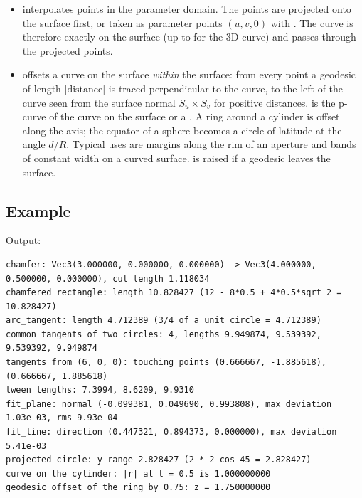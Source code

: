 \begin{itemize}
  \item {} interpolates points in the parameter domain. The points are projected onto
    the surface first, or taken as parameter points $(u, v, 0)$ with . The curve
    is therefore exactly on the surface (up to  for the 3D curve) and passes
    through the projected points.
  \item {} offsets a
    curve on the surface \emph{within} the surface: from every point a geodesic of length
    $|\text{distance}|$ is traced perpendicular to the curve, to the left of the curve seen from
    the surface normal $S_u \times S_v$ for positive distances.  is the p-curve of
    the curve on the surface or a . A ring around a cylinder is offset
    along the axis; the equator of a sphere becomes a circle of latitude at the angle
    $d/R$. Typical uses are margins along the rim of an aperture and bands of constant width
    on a curved surface.  is raised if a geodesic leaves the surface.
\end{itemize}

\subsection{Example}


Output:

\begin{lstlisting}[style=text]
chamfer: Vec3(3.000000, 0.000000, 0.000000) -> Vec3(4.000000, 0.500000, 0.000000), cut length 1.118034
chamfered rectangle: length 10.828427 (12 - 8*0.5 + 4*0.5*sqrt 2 = 10.828427)
arc_tangent: length 4.712389 (3/4 of a unit circle = 4.712389)
common tangents of two circles: 4, lengths 9.949874, 9.539392, 9.539392, 9.949874
tangents from (6, 0, 0): touching points (0.666667, -1.885618), (0.666667, 1.885618)
tween lengths: 7.3994, 8.6209, 9.9310
fit_plane: normal (-0.099381, 0.049690, 0.993808), max deviation 1.03e-03, rms 9.93e-04
fit_line: direction (0.447321, 0.894373, 0.000000), max deviation 5.41e-03
projected circle: y range 2.828427 (2 * 2 cos 45 = 2.828427)
curve on the cylinder: |r| at t = 0.5 is 1.000000000
geodesic offset of the ring by 0.75: z = 1.750000000
\end{lstlisting}

